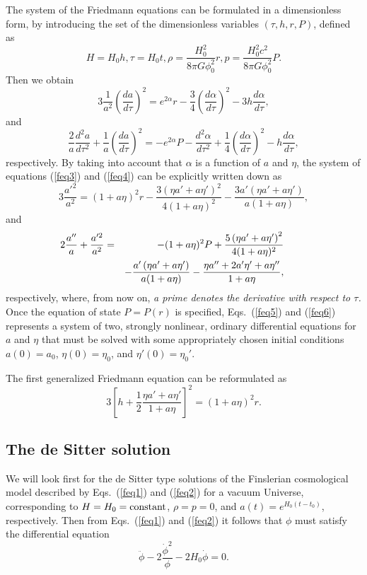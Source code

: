 \documentclass[aps,superscriptaddress, showpacs,preprintnumbers, superscriptaddress, nofootinbibt,twocolumn]{revtex4-2}
\def\be{\begin{equation}}
\def\ee{\end{equation}}
\def\bea{\begin{eqnarray}}
\def\eea{\end{eqnarray}}
\begin{document}
The system of the Friedmann equations can be formulated in a dimensionless form, by introducing the set of the dimensionless variables $\left(\tau, h, r, P\right)$, defined as
\be
H=H_0h, \tau =H_0t,\rho=\frac{H_0^2}{8\pi G\phi _0^2}r,p=\frac{H_0^2c^2}{8\pi G\phi _0^2}P.
\ee
Then we obtain
\be\label{feq3}
3\frac{1}{a^2}\left(\frac{da}{d\tau}\right)^2=e^{2\alpha}r-\frac{3}{4}\left(\frac{d\alpha }{d\tau}\right)^2-3h\frac{d\alpha }{d\tau},
\ee
and
\be\label{feq4}
\frac{2}{a}\frac{d^2a}{d\tau^2}+\frac{1}{a}\left(\frac{da}{d\tau}\right)^2=-e^{2\alpha}P-\frac{d^2\alpha}{d\tau ^2}+\frac{1}{4}\left(\frac{d\alpha}{d\tau}\right)^2-h\frac{d\alpha }{d\tau},
\ee
respectively. By taking into account that $\alpha$ is a function of $a$ and $\eta$, the system of equations (\ref{feq3}) and (\ref{feq4}) can be explicitly written down as
\be\label{feq5}
3\frac{a'^2}{a^2}=(1+a\eta)^2r-\frac{3 \left(\eta  a'+a \eta '\right)^2}{4 (1+a \eta
   )^2}-\frac{3 a' \left(\eta  a'+a \eta '\right)}{a (1+a \eta)},
\ee
and
\bea\label{feq6}
\hspace{-0.8cm}2\frac{a''}{a}+\frac{a'^2}{a^2}&=&-(1+a\eta)^2P+\frac{5 \left(\eta  a'+a \eta '\right)^2}{4 (1+a \eta
   )^2}\nonumber\\
\hspace{-0.8cm} &&  -\frac{a' \left(\eta  a'+a \eta '
   \right)}{a (1+a \eta )}-\frac{\eta  a''+2 a'
   \eta '+a \eta ''}{1+a \eta},
\eea
respectively, where, from now on, {\it a prime denotes the derivative with respect to $\tau$.} Once the equation of state $P=P(r)$ is specified, Eqs.~(\ref{feq5}) and (\ref{feq6}) represents a system of two, strongly nonlinear, ordinary differential equations for $a$ and $\eta$ that must be solved with some appropriately chosen initial conditions $a(0)=a_0$, $\eta (0)=\eta _0$, and $\eta '(0)=\eta _0'$.

The first generalized Friedmann equation can be reformulated as
\be
3\left[h+\frac{1}{2}\frac{\eta a'+a\eta'}{1+a\eta}\right]^2=(1+a\eta)^2r.
\ee

\subsection{The de Sitter solution}

We will look first for the de Sitter type solutions of the Finslerian cosmological model described by Eqs.~(\ref{feq1}) and (\ref{feq2}) for a vacuum Universe, corresponding to $H=H_0={\rm constant}$,  $\rho =p=0$, and $a(t)=e^{H_0\left(t-t_0\right)}$, respectively. Then from Eqs.~(\ref{feq1}) and (\ref{feq2}) it follows that $\phi$ must satisfy the differential equation
\be
\ddot{\phi}-2\frac{\dot{\phi}^2}{\phi}-2H_0\dot{\phi}=0.
\ee
\end{document}
